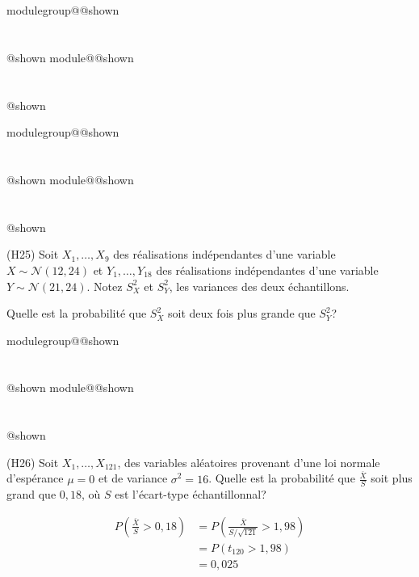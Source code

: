 \documentclass{Evaluation}
\makeatletter
\newcommand{\currentmodulekey}{}
\newcommand{\currentmoduletitle}{}
\newcommand{\currentgroupkey}{}
\newcommand{\currentgrouptitle}{}
\newcommand{\showmoduleifneeded}{%
  \ifx\currentgroupkey\empty\else
    \expandafter\ifx\csname modulegroup@\currentgroupkey @shown\endcsname\relax
      \section*{\currentgrouptitle}%
      \expandafter\gdef\csname modulegroup@\currentgroupkey @shown\endcsname{1}%
    \fi
  \fi
  \expandafter\ifx\csname module@\currentmodulekey @shown\endcsname\relax
    \section*{\currentmoduletitle}%
    \expandafter\gdef\csname module@\currentmodulekey @shown\endcsname{1}%
  \fi
}
\newenvironment{H25}{\showmoduleifneeded}{}
\newenvironment{H26}{\showmoduleifneeded}{}
\makeatother
\begin{document}
\begin{questions}
\begin{H25}
\end{H25}

\begin{H25}
\question
(H25) 
Soit $X_1,\hdots,X_9$ des réalisations indépendantes d'une variable $X\sim\mathcal{N}(12, 24)$ et $Y_1,\hdots,Y_{18}$ des réalisations indépendantes d'une variable $Y\sim\mathcal{N}(21, 24)$. 
Notez $S_X^2$ et $S_Y^2$, les variances des deux échantillons.

Quelle est la probabilité que $S_X^2$ soit deux fois plus grande que $S_Y^2$?
\end{H25}

\begin{H26}
\question
(H26) Soit $X_1,\hdots,X_{121}$, des variables aléatoires provenant d'une loi normale d'espérance $\mu=0$ et de variance $\sigma^2=16$. Quelle est la probabilité que $\displaystyle\frac{\overline{X}}{S}$ soit plus grand que $0,18$, où $S$ est l'écart-type échantillonnal?

    \begin{solution}
        \begin{align*}
            P\left(\frac{\overline{X}}{S}>0,18\right)&=P\left(\frac{\overline{X}}{S/\sqrt{121}}>1,98\right)\\
            &= P\left(t_{120}>1,98\right)\\
            &=0,025
        \end{align*}
    \end{solution}
\end{H26}


\end{questions}
\end{document}
